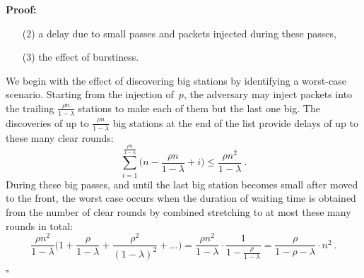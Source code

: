\documentclass[11pt]{article}
\newcommand{\qed}{\hfill $\square$}
\newenvironment{proof}{\noindent\textbf{Proof: }}{\qed \smallbreak}
\begin{document}
\begin{proof}
\begin{enumerate}
\item[(2)] a delay due to small passes and packets injected during these passes, 

\item[(3)] the effect of burstiness.
\end{enumerate}
We begin with the effect of discovering big stations by identifying a worst-case scenario.
Starting from the injection of~$p$, the adversary may inject packets into the trailing $\frac{\rho n}{1-\lambda}$ stations to make each of them but the last one big.
The discoveries of up to $\frac{\rho  n}{1-\lambda}$ big stations at the end of the list provide delays of up to these many clear rounds:
\[
\sum_{i=1}^{\frac{\rho n}{1-\lambda}} \bigl(n-\frac{\rho n}{1-\lambda}+i\bigr)
\le
\frac{\rho n^2}{1-\lambda} 
\ .
\]
During these big passes, and until the last big station becomes small after moved to the front, the worst case occurs when the duration of waiting time is obtained from the number of clear rounds by combined stretching to at most these many rounds in total:
\begin{equation}
\label{eqn:CMBTF-delay-big}
\frac{\rho n^2}{1-\lambda} \bigl(1+\frac{\rho}{1-\lambda} + \frac{\rho^2}{(1-\lambda)^2} +\ldots\bigr)
=\frac{\rho n^2}{1-\lambda}\cdot \frac{1}{1-\frac{\rho}{1-\lambda}}
=\frac{\rho }{1-\rho-\lambda}\cdot n^2
\ .
\end{equation}


\end{proof}
\end{document}
